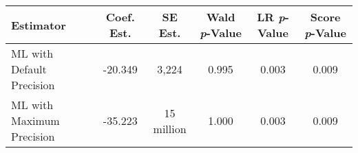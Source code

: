 
\begin{tabular}{lccccc}
\toprule
\textbf{Estimator} & \textbf{Coef. Est.} & \textbf{SE Est.} & \textbf{Wald \textit{p}-Value} & \textbf{LR \textit{p}-Value} & \textbf{Score \textit{p}-Value}\\
\midrule
ML with Default Precision & -20.349 & 3,224 & 0.995 & 0.003 & 0.009\\
ML with Maximum Precision & -35.223 & 15 million & 1.000 & 0.003 & 0.009\\
\bottomrule
\end{tabular}